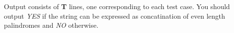 Output consists of   \textbf{    T   }   lines, one corresponding to each test case. You should output   \emph{    YES   }   if the string can be expressed as concatination of even length palindromes and   \emph{    NO   }   otherwise.